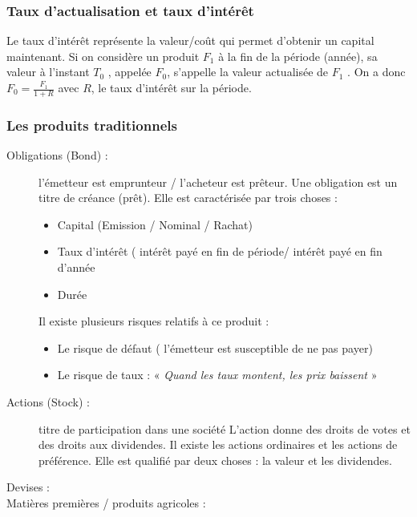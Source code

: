 \documentclass{report}
\begin{document}
\subsubsection{Taux d'actualisation et taux d'intérêt}
Le taux d’intérêt représente la valeur/coût qui permet d’obtenir un capital maintenant. 
Si on considère un produit $F_1$ à la fin de la période (année), sa valeur à l’instant $T_0$ , appelée $F_0$, s’appelle la valeur actualisée de $F_1$ . On a donc $\displaystyle F_0=\frac{F_1}{1+R}$ avec $R$, le taux d’intérêt sur la période.

\subsubsection{Les produits traditionnels}


\begin{description}
    \item [Obligations (Bond) :] l’émetteur est emprunteur / l’acheteur est prêteur.
    Une obligation est un titre de créance (prêt). Elle est caractérisée par trois choses :
    \begin{itemize}
        \item Capital (Emission / Nominal / Rachat)
        \item Taux d’intérêt ( intérêt payé en fin de période/ intérêt payé en fin d’année
        \item Durée
    \end{itemize}

    Il existe plusieurs risques relatifs à ce produit :
    \begin{itemize}
        \item Le risque de défaut ( l’émetteur est susceptible de ne pas payer)
        \item Le risque de taux : « \textit{Quand les taux montent, les prix baissent} »
    \end{itemize}
    \item [Actions (Stock) :] titre de participation dans une société 
    L’action donne des droits de votes et des droits aux dividendes.
    Il existe les actions ordinaires et les actions de préférence.
    Elle est qualifié par deux choses : la valeur et les dividendes.
    \item [Devises :]
    \item [Matières premières / produits agricoles :] 
\end{description}
\end{document}
